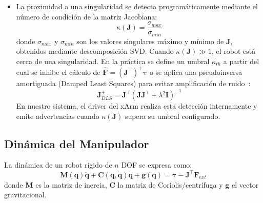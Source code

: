 \documentclass[journal,10pt,twoside]{IEEEtran}
\begin{document}
\begin{itemize}
    La segunda singularidad se presenta cuando el brazo se acerca demasiado a la base, reduciendo el determinante de $\bm{J}$ a valores cercanos a cero.
    
    Durante los experimentos, ambas configuraciones se manifestaron como advertencias del nodo \texttt{xarm\_driver}, que reportaba proximidad a singularidad o riesgo de colisión, acompañadas de retardo perceptible en el seguimiento y posiciones a las que el esclavo dejaba de llegar.
    \\
    \item La proximidad a una singularidad se detecta programáticamente 
mediante el número de condición de la matriz Jacobiana:
\[
    \kappa(\bm{J}) = \frac{\sigma_{max}}{\sigma_{min}}
\]
donde $\sigma_{max}$ y $\sigma_{min}$ son los valores singulares 
máximo y mínimo de $\bm{J}$, obtenidos mediante descomposición 
SVD. Cuando $\kappa(\bm{J}) \gg 1$, el robot está cerca de una 
singularidad. En la práctica se define un umbral $\kappa_{th}$ 
a partir del cual se inhibe el cálculo de 
$\hat{\bm{F}} = (\bm{J}^\top)^+\bm{\tau}$ o se aplica 
una pseudoinversa amortiguada (Damped Least Squares) para 
evitar amplificación de ruido~\cite{siciliano2009}:
\[
    \bm{J}^+_{DLS} = \bm{J}^\top(\bm{J}\bm{J}^\top + 
    \lambda^2\bm{I})^{-1}
\]
En nuestro sistema, el driver del xArm realiza esta detección 
internamente y emite advertencias cuando $\kappa(\bm{J})$ supera 
su umbral configurado.
    \\
\end{itemize}

\subsection{Dinámica del Manipulador}

La dinámica de un robot rígido de $n$ DOF se expresa como:
\begin{equation}
  \bm{M}(\bm{q})\ddot{\bm{q}} + \bm{C}(\bm{q},\dot{\bm{q}})\dot{\bm{q}}
  + \bm{g}(\bm{q}) = \bm{\tau} - \bm{J}^\top\bm{F}_{ext}
  \label{eq:dynamics}
\end{equation}
donde $\bm{M}$ es la matriz de inercia, $\bm{C}$ la matriz de
Coriolis/centrífuga y $\bm{g}$ el vector gravitacional.
\\
\end{document}
